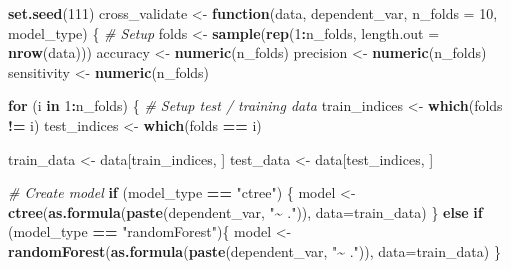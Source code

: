 \documentclass[
]{article}
\newenvironment{Shaded}{\begin{snugshade}}{\end{snugshade}}
\newcommand{\AttributeTok}[1]{\textcolor[rgb]{0.13,0.29,0.53}{#1}}
\newcommand{\CommentTok}[1]{\textcolor[rgb]{0.56,0.35,0.01}{\textit{#1}}}
\newcommand{\ControlFlowTok}[1]{\textcolor[rgb]{0.13,0.29,0.53}{\textbf{#1}}}
\newcommand{\DecValTok}[1]{\textcolor[rgb]{0.00,0.00,0.81}{#1}}
\newcommand{\FunctionTok}[1]{\textcolor[rgb]{0.13,0.29,0.53}{\textbf{#1}}}
\newcommand{\NormalTok}[1]{#1}
\newcommand{\OtherTok}[1]{\textcolor[rgb]{0.56,0.35,0.01}{#1}}
\newcommand{\SpecialCharTok}[1]{\textcolor[rgb]{0.81,0.36,0.00}{\textbf{#1}}}
\newcommand{\StringTok}[1]{\textcolor[rgb]{0.31,0.60,0.02}{#1}}
\begin{document}
\begin{Shaded}
\begin{Highlighting}[]
\FunctionTok{set.seed}\NormalTok{(}\DecValTok{111}\NormalTok{)}
\NormalTok{cross\_validate }\OtherTok{\textless{}{-}} \ControlFlowTok{function}\NormalTok{(data, dependent\_var, }\AttributeTok{n\_folds =} \DecValTok{10}\NormalTok{, model\_type) \{}
  \CommentTok{\# Setup}
\NormalTok{  folds }\OtherTok{\textless{}{-}} \FunctionTok{sample}\NormalTok{(}\FunctionTok{rep}\NormalTok{(}\DecValTok{1}\SpecialCharTok{:}\NormalTok{n\_folds, }\AttributeTok{length.out =} \FunctionTok{nrow}\NormalTok{(data)))}
\NormalTok{  accuracy }\OtherTok{\textless{}{-}} \FunctionTok{numeric}\NormalTok{(n\_folds)}
\NormalTok{  precision }\OtherTok{\textless{}{-}} \FunctionTok{numeric}\NormalTok{(n\_folds)}
\NormalTok{  sensitivity }\OtherTok{\textless{}{-}} \FunctionTok{numeric}\NormalTok{(n\_folds)}


  \ControlFlowTok{for}\NormalTok{ (i }\ControlFlowTok{in} \DecValTok{1}\SpecialCharTok{:}\NormalTok{n\_folds) \{}
    \CommentTok{\# Setup test / training data}
\NormalTok{    train\_indices }\OtherTok{\textless{}{-}} \FunctionTok{which}\NormalTok{(folds }\SpecialCharTok{!=}\NormalTok{ i)}
\NormalTok{    test\_indices }\OtherTok{\textless{}{-}} \FunctionTok{which}\NormalTok{(folds }\SpecialCharTok{==}\NormalTok{ i)}

\NormalTok{    train\_data }\OtherTok{\textless{}{-}}\NormalTok{ data[train\_indices, ]}
\NormalTok{    test\_data }\OtherTok{\textless{}{-}}\NormalTok{ data[test\_indices, ]}

    \CommentTok{\# Create model}
    \ControlFlowTok{if}\NormalTok{ (model\_type }\SpecialCharTok{==} \StringTok{"ctree"}\NormalTok{) \{}
\NormalTok{      model }\OtherTok{\textless{}{-}} \FunctionTok{ctree}\NormalTok{(}\FunctionTok{as.formula}\NormalTok{(}\FunctionTok{paste}\NormalTok{(dependent\_var, }\StringTok{"\textasciitilde{} ."}\NormalTok{)), }\AttributeTok{data=}\NormalTok{train\_data)}
\NormalTok{    \}}
    \ControlFlowTok{else} \ControlFlowTok{if}\NormalTok{ (model\_type }\SpecialCharTok{==} \StringTok{"randomForest"}\NormalTok{)\{}
\NormalTok{      model }\OtherTok{\textless{}{-}} \FunctionTok{randomForest}\NormalTok{(}\FunctionTok{as.formula}\NormalTok{(}\FunctionTok{paste}\NormalTok{(dependent\_var, }\StringTok{"\textasciitilde{} ."}\NormalTok{)), }\AttributeTok{data=}\NormalTok{train\_data)}
\NormalTok{    \}}


\end{Highlighting}
\end{Shaded}
\end{document}
